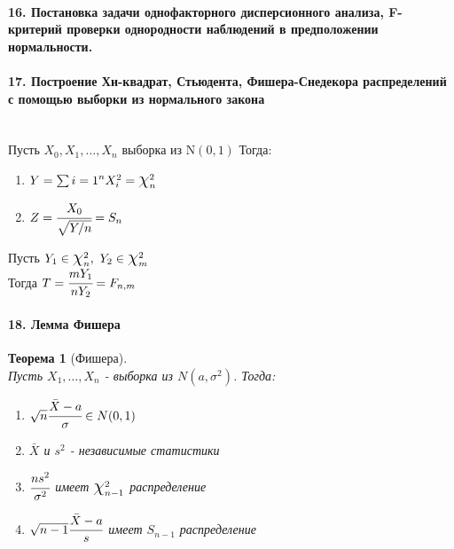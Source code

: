 \documentclass[titlepage]{article}
\newcommand{\sN}{\mathrm{N}} %
\newcommand*{\bigchi}{\mbox{\Large$\chi$}} %
\newtheorem{theorem}{Теорема}
\begin{document}
\paragraph{16. Постановка задачи однофакторного дисперсионного анализа, F-критерий проверки однородности наблюдений в предположении нормальности.}

\paragraph{17. Построение Хи-квадрат, Стьюдента, Фишера-Снедекора распределений с помощью выборки из нормального закона} ~\\
Пусть $X_0,X_1,\dots,X_n$ выборка из $\sN(0,1)$
Тогда:
\begin{enumerate}
	\item $Y = \sum{i=1}^n X_i^2 = \bigchi_n^2$
	\item $Z = \cfrac{X_0}{\sqrt{Y/n}} = S_n$
\end{enumerate}
Пусть $Y_1 \in \bigchi_n^2,\ Y_2 \in \bigchi_m^2$\\
Тогда $T = \cfrac{mY_1}{nY_2} = F_{n,m}$

\paragraph{18. Лемма Фишера}
\begin{theorem}[Фишера] ~\\
	Пусть $X_1,\dots,X_n$ - выборка из $N(a,\sigma^2)$. Тогда:
	\begin{enumerate}
		\item $\sqrt{n}\cfrac{\bar X - a}{\sigma} \in N(0,1)$
		\item $\bar X$ и $s^2$ - независимые статистики
		\item $\cfrac{ns^2}{\sigma^2}$ имеет $\bigchi^2_{n-1}$ распределение
		\item $\sqrt{n-1}\cfrac{\bar X - a}{s}$ имеет $S_{n-1}$ распределение
	\end{enumerate}
\end{theorem}
\end{document}
